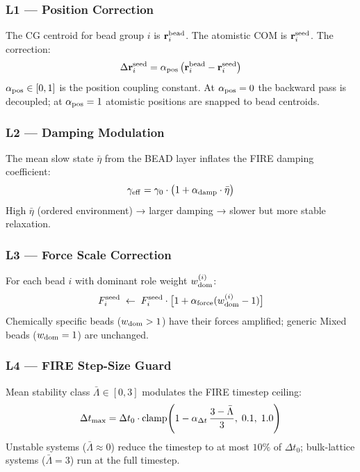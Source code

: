 \documentclass[11pt, a4paper, oneside]{article}
\theoremstyle{definition}
\begin{document}
\subsubsection{L1 — Position Correction}

The CG centroid for bead group $i$ is $\mathbf{r}_i^{\rm bead}$.
The atomistic COM is $\mathbf{r}_i^{\rm seed}$.  The correction:
%
\begin{equation}
  \Delta\mathbf{r}_i^{\rm seed}
  = \alpha_{\rm pos}\,\bigl(\mathbf{r}_i^{\rm bead} - \mathbf{r}_i^{\rm seed}\bigr)
  \label{eq:L1}
\end{equation}
%
$\alpha_{\rm pos} \in [0,1]$ is the position coupling constant.
At $\alpha_{\rm pos}=0$ the backward pass is decoupled; at
$\alpha_{\rm pos}=1$ atomistic positions are snapped to bead centroids.

\subsubsection{L2 — Damping Modulation}

The mean slow state $\bar\eta$ from the BEAD layer inflates the FIRE
damping coefficient:
%
\begin{equation}
  \gamma_{\rm eff} = \gamma_0 \cdot \bigl(1 + \alpha_{\rm damp} \cdot \bar\eta\bigr)
  \label{eq:L2}
\end{equation}
%
High $\bar\eta$ (ordered environment) → larger damping → slower
but more stable relaxation.

\subsubsection{L3 — Force Scale Correction}

For each bead $i$ with dominant role weight $w_{\rm dom}^{(i)}$:
%
\begin{equation}
  F_i^{\rm seed} \;\leftarrow\;
  F_i^{\rm seed} \cdot \bigl[1 + \alpha_{\rm force}(w_{\rm dom}^{(i)} - 1)\bigr]
  \label{eq:L3}
\end{equation}
%
Chemically specific beads ($w_{\rm dom} > 1$) have their forces
amplified; generic Mixed beads ($w_{\rm dom} = 1$) are unchanged.

\subsubsection{L4 — FIRE Step-Size Guard}

Mean stability class $\bar\Lambda \in [0,3]$ modulates the FIRE
timestep ceiling:
%
\begin{equation}
  \Delta t_{\rm max} = \Delta t_0 \cdot
  \operatorname{clamp}\!\left(
    1 - \alpha_{\Delta t}\,\frac{3-\bar\Lambda}{3},\;
    0.1,\; 1.0
  \right)
  \label{eq:L4}
\end{equation}
%
Unstable systems ($\bar\Lambda \approx 0$) reduce the timestep to at
most $10\%$ of $\Delta t_0$; bulk-lattice systems ($\bar\Lambda = 3$)
run at the full timestep.
\end{document}
